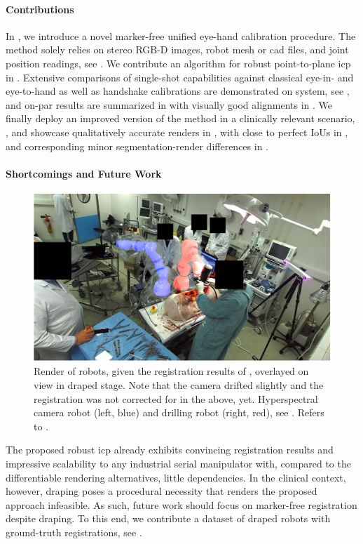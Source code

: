 \paragraph{Contributions} In , we introduce a novel marker-free unified eye-hand calibration procedure. The method solely relies on stereo RGB-D images, robot mesh or \gls{cad} files, and joint position readings, see . We contribute an algorithm for robust point-to-plane \gls{icp} in . Extensive comparisons of single-shot capabilities against classical eye-in- and eye-to-hand as well as handshake calibrations are demonstrated on system, see , and on-par results are summarized in  with visually good alignments in . We finally deploy an improved version of the method in a clinically relevant scenario, , and showcase qualitatively accurate renders in , with close to perfect IoUs in , and corresponding minor segmentation-render differences in .

\paragraph{Shortcomings and Future Work}
\begin{figure}[tb]
    \centering
    \includegraphics[width=\textwidth]{conclusion/img/draped_ground_truth.pdf}
    \caption{Render of robots, given the registration results of , overlayed on view in draped stage. Note that the camera drifted slightly and the registration was not corrected for in the above, yet. Hyperspectral camera robot (left, blue) and drilling robot (right, red), see . Refers to .}
    \label{con:fig:draped_ground_truth}
\end{figure}
The proposed robust \gls{icp} already exhibits convincing registration results and impressive scalability to any industrial serial manipulator with, compared to the differentiable rendering alternatives, little dependencies. In the clinical context, however, draping poses a procedural necessity that renders the proposed approach infeasible. As such, future work should focus on marker-free registration despite draping. To this end, we contribute a dataset of draped robots with ground-truth registrations, see .

